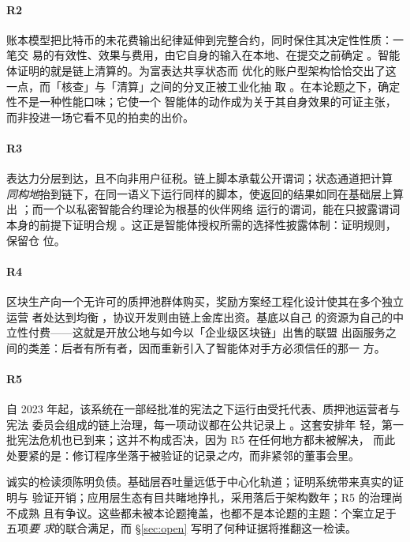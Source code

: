 \documentclass[11pt,UTF8]{ctexart}
\newcommand{\R}[1]{R#1}
\begin{document}
\paragraph{\R{2}}
账本模型把比特币的未花费输出纪律延伸到完整合约，同时保住其决定性性质：一笔交
易的有效性、效果与费用，由它自身的输入在本地、在提交之前确定
\citep{chakravarty2020eutxo}。智能体证明的就是链上清算的。为富表达共享状态而
优化的账户型架构恰恰交出了这一点，而「核查」与「清算」之间的分叉正被工业化抽
取 \citep{daian2020flashboys}。在本论题之下，确定性不是一种性能口味；它使一个
智能体的动作成为关于其自身效果的可证主张，而非投进一场它看不见的拍卖的出价。

\paragraph{\R{3}}
表达力分层到达，且不向非用户征税。链上脚本承载公开谓词；状态通道把计算\emph{
同构地}抬到链下，在同一语义下运行同样的脚本，使返回的结果如同在基础层上算出
\citep{chakravarty2021hydra}；而一个以私密智能合约理论为根基的伙伴网络
\citep{kerber2021kachina} 运行的谓词，能在只披露谓词本身的前提下证明合规
\citep{midnight2024}。这正是智能体授权所需的选择性披露体制：证明规则，保留仓
位。

\paragraph{\R{4}}
区块生产向一个无许可的质押池群体购买，奖励方案经工程化设计使其在多个独立运营
者处达到均衡 \citep{brunjes2020rewards}，协议开发则由链上金库出资。基底以自己
的资源为自己的中立性付费——这就是开放公地与如今以「企业级区块链」出售的联盟
出函服务之间的类差：后者有所有者，因而重新引入了智能体对手方必须信任的那一
方。

\paragraph{\R{5}}
自 2023 年起，该系统在一部经批准的宪法之下运行由受托代表、质押池运营者与宪法
委员会组成的链上治理，每一项动议都在公共记录上 \citep{cip1694}。这套安排年
轻，第一批宪法危机也已到来；这并不构成否决，因为 \R{5} 在任何地方都未被解决，
而此处要紧的是：修订程序坐落于被验证的记录\emph{之内}，而非紧邻的董事会里。

诚实的检读须陈明负债。基础层吞吐量远低于中心化轨道；证明系统带来真实的证明与
验证开销；应用层生态有目共睹地挣扎，采用落后于架构数年；\R{5} 的治理尚不成熟
且有争议。这些都未被本论题掩盖，也都不是本论题的主题：个案立足于五项\emph{要
求}的联合满足，而 \S\ref{sec:open} 写明了何种证据将推翻这一检读。
\end{document}
